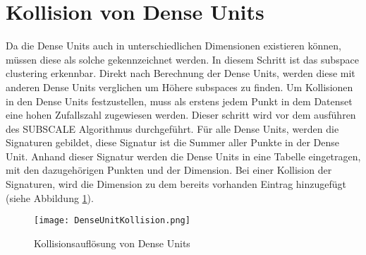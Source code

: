 \section{Kollision von Dense Units}

Da die Dense Units auch in unterschiedlichen Dimensionen existieren können, müssen diese als solche gekennzeichnet werden. In diesem Schritt ist das subspace clustering erkennbar. Direkt nach Berechnung der Dense Units, werden diese mit anderen Dense Units verglichen um Höhere subspaces zu finden. Um Kollisionen in den Dense Units festzustellen, muss als erstens jedem Punkt in dem Datenset eine hohen Zufallszahl zugewiesen werden.  Dieser schritt wird vor dem ausführen des SUBSCALE Algorithmus durchgeführt. Für alle Dense Units, werden die Signaturen gebildet, diese Signatur ist die Summer aller Punkte in der Dense Unit. Anhand dieser Signatur werden die Dense Units in eine Tabelle eingetragen, mit den dazugehörigen Punkten und der Dimension. Bei einer Kollision der Signaturen, wird die Dimension zu dem bereits vorhanden Eintrag hinzugefügt (siehe Abbildung \ref{dense-collision}). \cite{Ramin}

\begin{figure}[h]
	\centering
	\texttt{[image: DenseUnitKollision.png]}
	\caption{Kollisionsauflösung von Dense Units}
	\label{dense-collision}
\end{figure}


